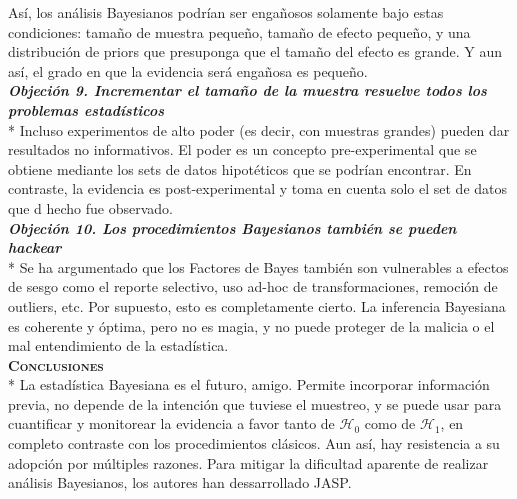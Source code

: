 \documentclass[a4paper,12pt]{article}
\begin{document}
Así, los análisis Bayesianos podrían ser engañosos solamente bajo estas condiciones: tamaño de muestra pequeño, tamaño de efecto pequeño, y una distribución de priors que presuponga que el tamaño del efecto es grande. Y aun así, el grado en que la evidencia será engañosa es pequeño.\\

{\slshape\bfseries Objeción 9. Incrementar el tamaño de la muestra resuelve todos los problemas estadísticos}\\*
Incluso experimentos de alto poder (es decir, con muestras grandes) pueden dar resultados no informativos. El poder es un concepto pre-experimental que se obtiene mediante los sets de datos hipotéticos que se podrían encontrar. En contraste, la evidencia es post-experimental y toma en cuenta solo el set de datos que d hecho fue observado.\\

{\slshape\bfseries Objeción 10. Los procedimientos Bayesianos también se pueden hackear}\\*
Se ha argumentado que los Factores de Bayes también son vulnerables a efectos de sesgo como el reporte selectivo, uso ad-hoc de transformaciones, remoción de outliers, etc. Por supuesto, esto es completamente cierto. La inferencia Bayesiana es coherente y óptima, pero no es magia, y no puede proteger de la malicia o el mal entendimiento de la estadística.\\

{\scshape\bfseries Conclusiones}\\*
La estadística Bayesiana es el futuro, amigo. Permite incorporar información previa, no depende de la intención que tuviese el muestreo, y se puede usar para cuantificar y monitorear la evidencia a favor tanto de $\mathcal H_0$ como de $\mathcal H_1$, en completo contraste con los procedimientos clásicos. Aun así, hay resistencia a su adopción por múltiples razones. Para mitigar la dificultad aparente de realizar análisis Bayesianos, los autores han dessarrollado JASP.
\end{document}
